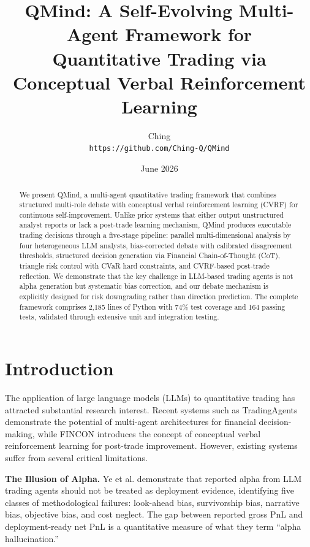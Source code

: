 \documentclass[twocolumn]{article}
\title{QMind: A Self-Evolving Multi-Agent Framework for \\ Quantitative Trading via Conceptual Verbal Reinforcement Learning}
\author{Ching \\
\texttt{https://github.com/Ching-Q/QMind}}
\date{June 2026}
\begin{document}
\maketitle

\begin{abstract}
We present QMind, a multi-agent quantitative trading framework that combines structured multi-role debate with conceptual verbal reinforcement learning (CVRF) for continuous self-improvement. Unlike prior systems that either output unstructured analyst reports or lack a post-trade learning mechanism, QMind produces executable trading decisions through a five-stage pipeline: parallel multi-dimensional analysis by four heterogeneous LLM analysts, bias-corrected debate with calibrated disagreement thresholds, structured decision generation via Financial Chain-of-Thought (CoT), triangle risk control with CVaR hard constraints, and CVRF-based post-trade reflection. We demonstrate that the key challenge in LLM-based trading agents is not alpha generation but systematic bias correction, and our debate mechanism is explicitly designed for risk downgrading rather than direction prediction. The complete framework comprises 2,185 lines of Python with 74\% test coverage and 164 passing tests, validated through extensive unit and integration testing.
\end{abstract}

\section{Introduction}

The application of large language models (LLMs) to quantitative trading has attracted substantial research interest\cite{ding2024llmsurvey,xia2026agentic}. Recent systems such as TradingAgents\cite{tradingagents2024} demonstrate the potential of multi-agent architectures for financial decision-making, while FINCON\cite{fincon2024} introduces the concept of conceptual verbal reinforcement learning for post-trade improvement. However, existing systems suffer from several critical limitations.

\textbf{The Illusion of Alpha.} Ye et al.\cite{ye2026alpha} demonstrate that reported alpha from LLM trading agents should not be treated as deployment evidence, identifying five classes of methodological failures: look-ahead bias, survivorship bias, narrative bias, objective bias, and cost neglect. The gap between reported gross PnL and deployment-ready net PnL is a quantitative measure of what they term ``alpha hallucination.''
\end{document}
